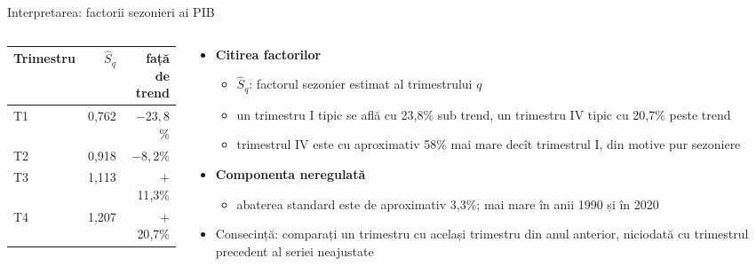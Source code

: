 \begin{frame}{Interpretarea: factorii sezonieri ai PIB}
\itemsize{\footnotesize}
\begin{columns}[T]
\begin{column}{0.36\textwidth}
\begin{center}
\footnotesize
\begin{tabular}{lrr}
\toprule
\textbf{Trimestru} & $\hat S_q$ & față de trend \\
\midrule
T1 & 0{,}762 & $\ensuremath{-}23{,}8$\% \\
T2 & 0{,}918 & $\ensuremath{-}8{,}2$\% \\
T3 & 1{,}113 & $+$11{,}3\% \\
T4 & 1{,}207 & $+$20{,}7\% \\
\bottomrule
\end{tabular}
\end{center}

\end{column}
\begin{column}{0.60\textwidth}
\begin{itemize}
    \item \textbf{Citirea factorilor}
    \begin{itemize}
        \item $\hat S_q$: factorul sezonier estimat al trimestrului $q$
        \item un trimestru I tipic se află cu 23{,}8\% sub trend, un trimestru IV tipic cu 20{,}7\% peste trend
        \item trimestrul IV este cu aproximativ 58\% mai mare decît trimestrul I, din motive pur sezoniere
    \end{itemize}
    \item \textbf{Componenta neregulată}
    \begin{itemize}
        \item abaterea standard este de aproximativ 3{,}3\%; mai mare în anii 1990 și în 2020
    \end{itemize}
    \item Consecință: comparați un trimestru cu același trimestru din anul anterior, niciodată cu trimestrul precedent al seriei neajustate
\end{itemize}
\end{column}
\end{columns}
\end{frame}

